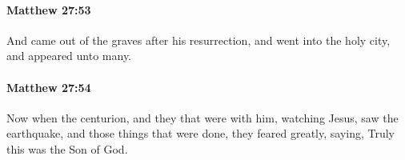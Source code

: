 		\paragraph{Matthew 27:53} %
			\label{MATTHEW-27-53}

			And came out of the graves after his resurrection, and went into the holy city, and appeared unto many.

			\begin{framed}
			\scriptsize
				\begin{compactdesc}
					\item[SBLG] 
				\end{compactdesc}
			\end{framed}

		\paragraph{Matthew 27:54} %
			\label{MATTHEW-27-54}

			Now when the centurion, and they that were with him, watching Jesus, saw the earthquake, and those things that were done, they feared greatly, saying, Truly this was the Son of God.

